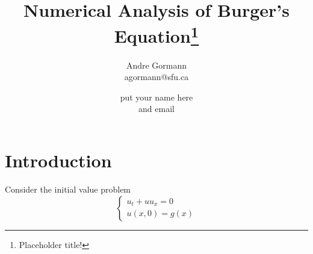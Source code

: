 \documentclass{myproject}
\title{Numerical Analysis of Burger's Equation\footnote{Placeholder title!}}
\date{}
\author{
    Andre Gormann\\
    agormann@sfu.ca
    \and
    put your name here\\
    and email
}
\begin{document}
\maketitle

\section{Introduction}
Consider the initial value problem
\[
    \begin{cases}
        u_t + uu_x = 0 \\
        u(x, 0) = g(x)
    \end{cases}
\]

\nocite{choksi2022}
\nocite{kutz2013}
\printbibliography
\end{document}
